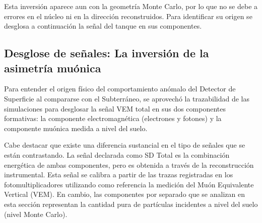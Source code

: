Esta inversión aparece aun con la geometría Monte Carlo, por lo que no se debe a errores en el núcleo ni en la dirección reconstruidos. Para identificar su origen se desglosa a continuación la señal del tanque en sus componentes.

\subsection{Desglose de señales: La inversión de la asimetría muónica}
\label{subsubsec:desglose_sd}

Para entender el origen físico del comportamiento anómalo del Detector de Superficie al compararse con el Subterráneo, se aprovechó la trazabilidad de las simulaciones para desglosar la señal VEM total en sus dos componentes formativas: la componente electromagnética (electrones y fotones) y la componente muónica medida a nivel del suelo. 

Cabe destacar que existe una diferencia sustancial en el tipo de señales que se están contrastando. La señal declarada como SD Total es la combinación energética de ambas componentes, pero es obtenida a través de la reconstrucción instrumental. Esta señal se calibra a partir de las trazas registradas en los fotomultiplicadores utilizando como referencia la medición del Muón Equivalente Vertical (VEM). En cambio, las componentes por separado que se analizan en esta sección representan la cantidad pura de partículas incidentes a nivel del suelo (nivel Monte Carlo). 

